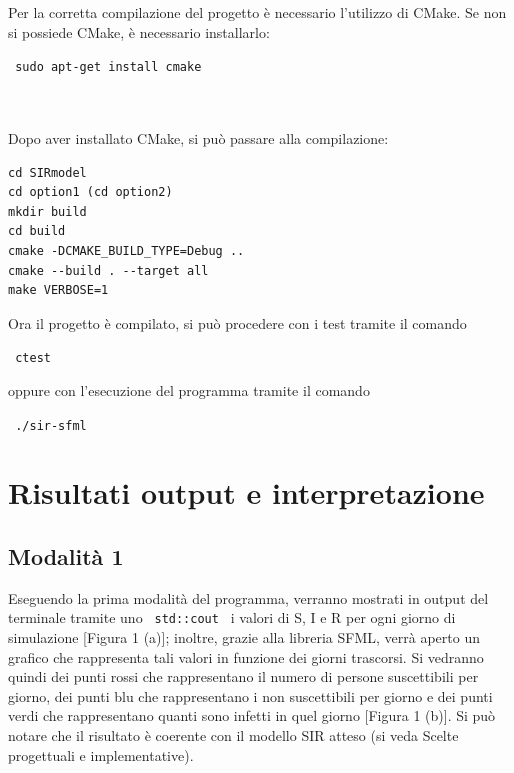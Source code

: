 \documentclass[a4paper,10 pt]{article}
\begin{document}
Per la corretta compilazione del progetto è necessario l'utilizzo di CMake. %
Se non si possiede CMake, è necessario installarlo:
\begin {quoting}
 \verb! sudo apt-get install cmake !
\end{quoting}
\ \\
\ \\
Dopo aver installato CMake, si può passare alla compilazione:
\begin {quoting}
 \begin {verbatim}
cd SIRmodel
cd option1 (cd option2)
mkdir build
cd build
cmake -DCMAKE_BUILD_TYPE=Debug ..
cmake --build . --target all
make VERBOSE=1 
\end{verbatim}
\end{quoting}
Ora il progetto è compilato, si può procedere con i test tramite il comando
\begin {quoting}
 \verb! ctest !
\end{quoting}
oppure con l'esecuzione del programma tramite il comando
\begin {quoting}
 \verb! ./sir-sfml !
\end{quoting}
\section{Risultati output e interpretazione}
\subsection{Modalità 1}
Eseguendo la prima modalità del programma, verranno mostrati in output del terminale tramite uno  \verb! std::cout ! i valori di S, I e R per ogni giorno di simulazione [Figura 1 (a)]; inoltre, grazie alla libreria SFML, verrà aperto un grafico che rappresenta tali valori in funzione dei giorni trascorsi. Si vedranno quindi dei punti rossi che rappresentano il numero di persone suscettibili per giorno, dei punti blu che rappresentano i non suscettibili per giorno e dei punti verdi che rappresentano quanti sono infetti in quel giorno [Figura 1 (b)]. Si può notare che il risultato è coerente con il modello SIR atteso (si veda Scelte progettuali e implementative).
\end{document}
